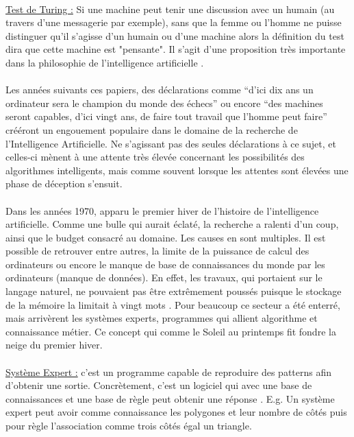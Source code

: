 \documentclass[10pt, french, a4paper]{report}
\begin{document}
\paragraph{}
\underline{Test de Turing :} Si une machine peut tenir une discussion avec un humain (au travers d’une messagerie par exemple), sans que la femme ou l’homme ne puisse distinguer qu’il s’agisse d’un humain ou d’une machine alors la définition du test dira que cette machine est "pensante". Il s’agit d’une proposition très importante dans la philosophie de l’intelligence artificielle \citep{pinar_saygin_turing_2000}. 

\paragraph{}
Les années suivants ces papiers, des déclarations comme ``d’ici dix ans un ordinateur sera le champion du monde des échecs'' \citep{simon_heuristic_1958} ou encore ``des machines seront capables, d’ici vingt ans, de faire tout travail que l’homme peut faire'' \citep{simon_shape_1965} crééront un engouement populaire dans le domaine de la recherche de l'Intelligence Artificielle. Ne s'agissant pas des seules déclarations à ce sujet, et celles-ci mènent à une attente très élevée concernant les possibilités des algorithmes intelligents, mais comme souvent lorsque les attentes sont élevées une phase de déception s’ensuit.

\paragraph{}
Dans les années 1970, apparu le premier hiver de l’histoire de l’intelligence artificielle. Comme une bulle qui aurait éclaté, la recherche a ralenti d’un coup, ainsi que le budget consacré au domaine. Les causes en sont multiples. Il est possible de retrouver entre autres, la limite de la puissance de calcul des ordinateurs ou encore le manque de base de connaissances du monde par les ordinateurs (manque de données). En effet, les travaux, qui portaient sur le langage naturel, ne pouvaient pas être extrêmement poussés puisque le stockage de la mémoire la limitait à vingt mots \citep{crevier_ai:_1992}. Pour beaucoup ce secteur a été enterré, mais arrivèrent les systèmes experts, programmes qui allient algorithme et connaissance métier. Ce concept qui comme le Soleil au printemps fit fondre la neige du premier hiver.

\paragraph{}
\underline{Système Expert :} c'est un programme capable de reproduire des patterns afin d'obtenir une sortie. Concrètement, c'est un logiciel qui avec une base de connaissances et une base de règle peut obtenir une réponse \citep{jackson_introduction_1998}. E.g. Un système expert peut avoir comme connaissance les polygones et leur nombre de côtés puis pour règle l'association comme trois côtés égal un triangle.
\end{document}
